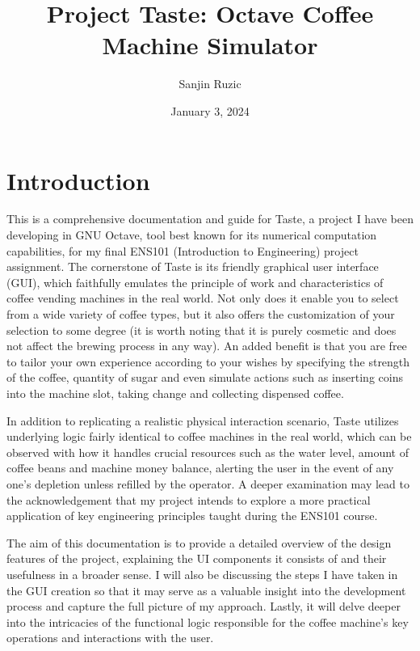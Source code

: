 \documentclass[a4paper, 11pt]{article}
\title{Project Taste: Octave Coffee Machine Simulator}
\author{Sanjin Ruzic}
\date{January 3, 2024}
\begin{document}
\maketitle
\vspace{5mm}
\newpage

\tableofcontents
\newpage

\section{Introduction}
\noindent This is a comprehensive documentation and guide for Taste, a project I have been developing in GNU Octave, tool best known for its numerical computation capabilities, for my final ENS101 (Introduction to Engineering) project assignment. The cornerstone of Taste is its friendly graphical user interface (GUI), which faithfully emulates the principle of work and characteristics of coffee vending machines in the real world. Not only does it enable you to select from a wide variety of coffee types, but it also offers the customization of your selection to some degree (it is worth noting that it is purely cosmetic and does not affect the brewing process in any way). An added benefit is that you are free to tailor your own experience according to your wishes by specifying the strength of the coffee, quantity of sugar and even simulate actions such as inserting coins into the machine slot, taking change and collecting dispensed coffee.
\vspace{5mm}

\noindent In addition to replicating a realistic physical interaction scenario, Taste utilizes underlying logic fairly identical to coffee machines in the real world, which can be observed with how it handles crucial resources such as the water level, amount of coffee beans and machine money balance, alerting the user in the event of any one's depletion unless refilled by the operator. A deeper examination may lead to the acknowledgement that my project intends to explore a more practical application of key engineering principles taught during the ENS101 course.
\vspace{5mm}

\noindent The aim of this documentation is to provide a detailed overview of the design features of the project, explaining the UI components it consists of and their usefulness in a broader sense. I will also be discussing the steps I have taken in the GUI creation so that it may serve as a valuable insight into the development process and capture the full picture of my approach. Lastly, it will delve deeper into the intricacies of the functional logic responsible for the coffee machine's key operations and interactions with the user.
\end{document}
